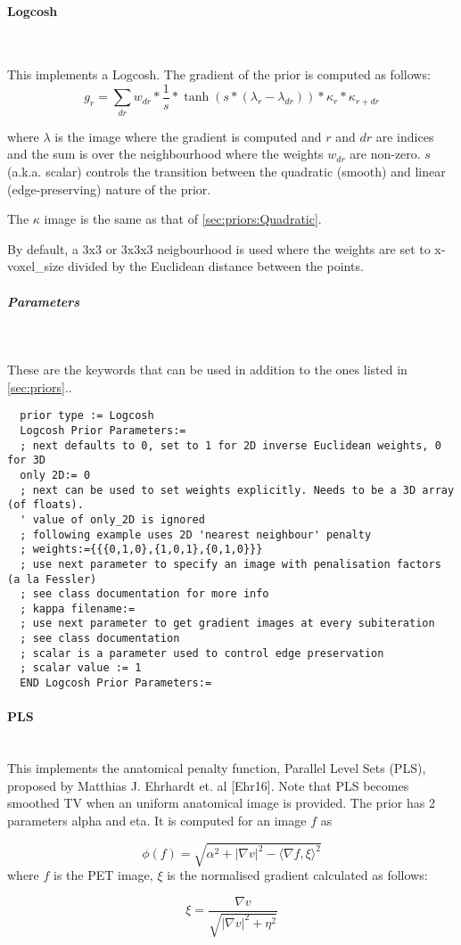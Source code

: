 \documentclass{article}
\newcommand{\subsubsubsection}[1]{\paragraph{#1}\mbox{} \\}
\newcommand{\subsubsubsubsection}[1]{\subparagraph{#1} \mbox{} \\}
\begin{document}
{{{ \subsubsubsection{Logcosh} \label{sec:priors:Logcosh}
}
This implements a Logcosh. The gradient of the prior is computed as follows:
  \[g_r = \sum_{dr} w_{dr} * \frac{1}{s} * \tanh(s*(\lambda_{r} - \lambda_{dr})) *
  \kappa_r * \kappa_{r+dr}\]

  \noindent where $\lambda$ is the image where the gradient is computed
   and $r$ and $dr$ are indices and the sum
  is over the neighbourhood where the weights $w_{dr}$ are non-zero.
  $s$ (a.k.a. scalar) controls the transition between the quadratic (smooth) and linear (edge-preserving) nature of the prior.

  The $\kappa$ image is the same as that of \ref{sec:priors:Quadratic}.

  By default, a 3x3 or 3x3x3 neigbourhood is used where the weights are set to 
  x-voxel\_size divided by the Euclidean distance between the points.
 
{ \subsubsubsubsection{Parameters}
}
  These are the keywords that can be used in addition to the ones listed in \ref{sec:priors}..
  \begin{verbatim}
  prior type := Logcosh
  Logcosh Prior Parameters:=
  ; next defaults to 0, set to 1 for 2D inverse Euclidean weights, 0 for 3D 
  only 2D:= 0
  ; next can be used to set weights explicitly. Needs to be a 3D array (of floats).
  ' value of only_2D is ignored
  ; following example uses 2D 'nearest neighbour' penalty
  ; weights:={{{0,1,0},{1,0,1},{0,1,0}}}
  ; use next parameter to specify an image with penalisation factors (a la Fessler)
  ; see class documentation for more info
  ; kappa filename:=
  ; use next parameter to get gradient images at every subiteration
  ; see class documentation
  ; scalar is a parameter used to control edge preservation
  ; scalar value := 1
  END Logcosh Prior Parameters:=
  \end{verbatim}


{ \subsubsubsection{PLS}
This implements the  anatomical penalty function, Parallel Level Sets (PLS),  proposed by Matthias J. Ehrhardt et. al [Ehr16]. Note that
  PLS becomes smoothed TV when an uniform anatomical image is provided.  
The prior has 2 parameters alpha and eta. It is computed for an image $ f $ as

  \[
  \phi(f) = \sqrt{\alpha^2 + |\nabla v|^2 - {\langle\nabla f,\xi\rangle}^2}
  \]
  where $ f $ is the PET image, $ \xi $ is the normalised gradient calculated as follows:

  \[
  \xi = \frac{\nabla v}{\sqrt{|\nabla v|^2 + \eta^2}}
  \]

}}}
\end{document}
